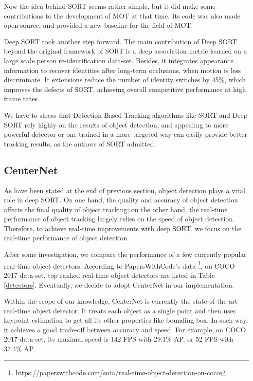 \documentclass[conference]{IEEEtran}
\begin{document}
Now the idea behind SORT seems rather simple, but it did make some contributions to the development of MOT at that time. Its code was also made open source, and provided a new baseline for the field of MOT.

Deep SORT took another step forward. The main contribution of Deep SORT beyond the original framework of SORT is a deep association metric learned on a large scale person re-identification data-set. Besides, it integrates appearance information to recover identities after long-term occlusions, when motion is less discriminate. It extensions reduce the number of identity switches by 45\%, which improves the defects of SORT, achieving overall competitive performance at high frame rates.

We have to stress that Detection-Based Tracking algorithms like SORT and Deep SORT rely highly on the results of object detection, and appealing to more powerful detector or one trained in a more targeted way can easily provide better tracking results, as the authors of SORT admitted.

\subsection{CenterNet}
As have been stated at the end of previous section, object detection plays a vital role in deep SORT. On one hand, the quality and accuracy of object detection affects the final quality of object tracking; on the other hand, the real-time performance of object tracking largely relies on the speed of object detection. Therefore, to achieve real-time improvements with deep SORT, we focus on the real-time performance of object detection.

After some investigation, we compare the performance of a few currently popular real-time object detectors. According to PapersWithCode's data \footnote{https://paperswithcode.com/sota/real-time-object-detection-on-coco}, on COCO 2017 data-set, top ranked real-time object detectors are listed in Table \ref{detectors}. Eventually, we decide to adopt CenterNet \cite{zhou2019objects} in our implementation.

Within the scope of our knowledge, CenterNet is currently the state-of-the-art real-time object detector. It treats each object as a single point and then uses keypoint estimation to get all its other properties like bounding box. In such way, it achieves a good trade-off between accuracy and speed. For example, on COCO 2017 data-set, its maximal speed is 142 FPS with 29.1\% AP, or 52 FPS with 37.4\% AP.
\end{document}

